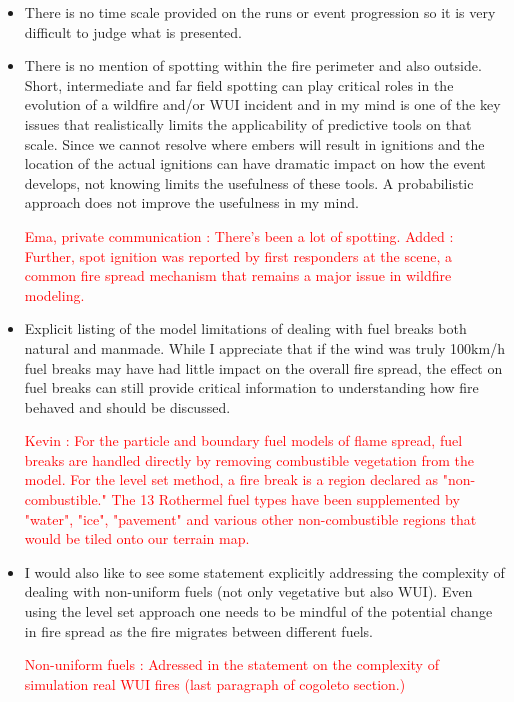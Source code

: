\documentclass[12pt]{article}
\newcommand\hl[1]{\textcolor{red}{#1}}
\begin{document}
\begin{itemize}
   \item There is no time scale provided on the runs or event progression so it is very difficult to judge what is presented.

   \item There is no mention of spotting within the fire perimeter and also outside. Short, intermediate and far field spotting can play critical roles in the evolution of a wildfire and/or WUI incident and in my mind is one of the key issues that realistically limits the applicability of predictive tools on that scale. Since we cannot resolve where embers will result in ignitions and the location of the actual ignitions can have dramatic impact on how the event develops, not knowing limits the usefulness of these tools. A probabilistic approach does not improve the usefulness in my mind.

   \hl{Ema, private communication : There's been a lot of spotting. Added : Further, spot ignition was reported by first responders at the scene, a common fire spread mechanism that remains a major issue in wildfire modeling.}

   \item Explicit listing of the model limitations of dealing with fuel breaks both natural and manmade. While I appreciate that if the wind was truly 100km/h fuel breaks may have had little impact on the overall fire spread, the effect on fuel breaks can still provide critical information to understanding how fire behaved and should be discussed. 

    \hl{Kevin : For the particle and boundary fuel models of flame spread, fuel breaks are handled directly by removing combustible vegetation from the model. For the level set method, a fire break is a region declared as "non-combustible." The 13 Rothermel fuel types have been supplemented by "water", "ice", "pavement" and various other non-combustible regions that would be tiled onto our terrain map.}

   \item I would also like to see some statement explicitly addressing the complexity of dealing with non-uniform fuels (not only vegetative but also WUI). Even using the level set approach one needs to be mindful of the potential change in fire spread as the fire migrates between different fuels.

   \hl{Non-uniform fuels : Adressed in the statement on the complexity of simulation real WUI fires (last paragraph of cogoleto section.)}

\end{itemize}
\end{document}
